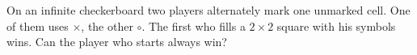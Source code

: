On an infinite checkerboard two players alternately mark one unmarked cell. One of them uses $\times$,  the other $\circ$. The first who fills a $2\times 2$ square with his symbols wins. Can the player who starts always win?